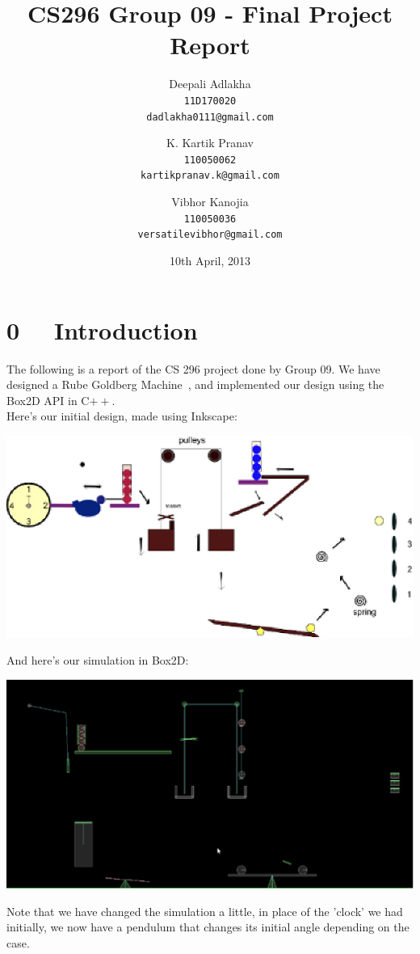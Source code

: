 \documentclass[a4paper,11pt]{article}
\title{CS296 Group 09 - Final Project Report}
\author{
  Deepali Adlakha\\
  \texttt{11D170020}\\
  \texttt{dadlakha0111@gmail.com}
  \and
  K. Kartik Pranav\\
  \texttt{110050062}\\
  \texttt{kartikpranav.k@gmail.com}
  \and
  Vibhor Kanojia\\
  \texttt{110050036}\\
  \texttt{versatilevibhor@gmail.com}
}
\date{10th April, 2013}
\begin{document}


\maketitle

\section*{0 ~~Introduction}
The following is a report of the CS 296 project done by Group 09. We have designed a Rube Goldberg Machine~\cite{rgm}, and implemented our design using the Box2D API in C$++$.\\
Here's our initial design, made using Inkscape:
\\
\begin{center}
\includegraphics{doc/rgm.eps}
\end{center}
And here's our simulation in Box2D:
\\
\begin{center}
\includegraphics{doc/rgmsim1.eps}\\
\end{center}

Note that we have changed the simulation a little, in place of the 'clock' we had initially, we now have a pendulum that changes its initial angle depending on the case.
\end{document}
